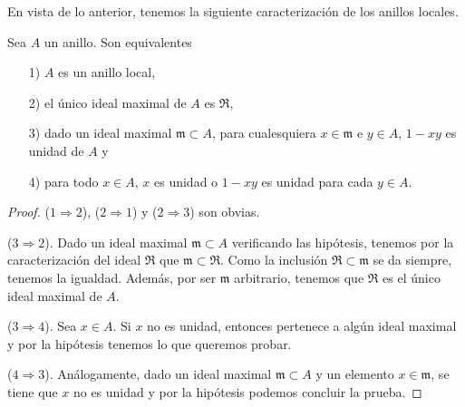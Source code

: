 \documentclass[./main.tex]{subfiles}
\begin{document}
	En vista de lo anterior, tenemos la siguiente caracterización de los anillos locales.
	\begin{proposition}
		Sea $A$ un anillo. Son equivalentes
		\begin{itemize}
			\item[1)] $A$ es un anillo local,
			\item[2)] el único ideal maximal de $A$ es $\mathfrak R$,
			\item[3)] dado un ideal maximal $\mathfrak m\subset A$, para cualesquiera $x\in\mathfrak m$ e $y\in A$, $1-xy$ es unidad de $A$ y
			\item[4)] para todo $x\in A$, $x$ es unidad o $1-xy$ es unidad para cada $y\in A$.
		\end{itemize}
	\end{proposition}
	\begin{proof}
		
		
		($1\Rightarrow2$), ($2\Rightarrow1$) y ($2\Rightarrow 3$) son obvias.
		
		($3\Rightarrow2$). Dado un ideal maximal $\mathfrak m\subset A$ verificando las hipótesis, tenemos por la caracterización del ideal $\mathfrak R$ que $\mathfrak m\subset \mathfrak R$. Como la inclusión $\mathfrak R\subset \mathfrak m$ se da siempre, tenemos la igualdad. Además, por ser $\mathfrak m$ arbitrario, tenemos que $\mathfrak R$ es el único ideal maximal de $A$.
		
		($3\Rightarrow 4$). Sea $x\in A$. Si $x$ no es unidad, entonces pertenece a algún ideal maximal y por la hipótesis tenemos lo que queremos probar.
		
		($4\Rightarrow 3$). Análogamente, dado un ideal maximal $\mathfrak m\subset A$ y un elemento $x\in\mathfrak m$, se tiene que $x$ no es unidad y por la hipótesis podemos concluir la prueba.
		
	\end{proof}
	
\end{document}
